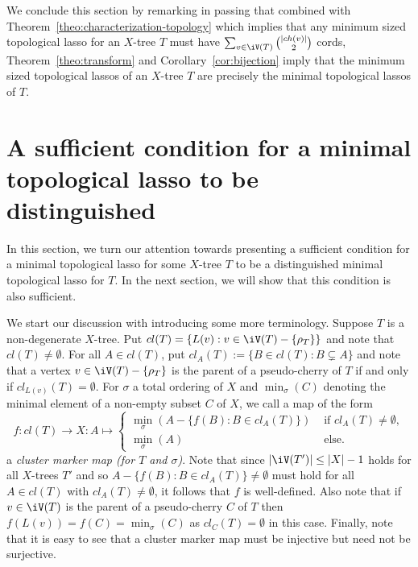 We conclude this section by remarking in passing that combined with
Theorem~\ref{theo:characterization-topology} which implies that any minimum
sized topological lasso for an $X$-tree $T$ must have $\sum_{v\in
  \iV(T)}{|ch(v)|\choose 2}$ cords, Theorem~\ref{theo:transform} and
Corollary~\ref{cor:bijection} imply that the minimum sized topological lassos
of an $X$-tree $T$ are precisely the minimal topological lassos of $T$.
 
\section{A sufficient condition for a minimal topological lasso to be
  distinguished}
\label{sec:sufficient}
In this section, we turn our attention towards presenting a sufficient
condition for a minimal topological lasso for some $X$-tree $T$ to be a
distinguished minimal topological lasso for $T$.  In the next section, we will
show that this condition is also sufficient.

We start our discussion with introducing some more terminology.  Suppose $T$
is a non-degenerate $X$-tree. Put $cl(T)=\{L(v): v\in \iV(T)-\{\rho_T\}\}$ and
note that $cl(T)\not=\emptyset$. For all $A\in cl(T)$, put $cl_A(T):=\{B\in
cl(T): B\subsetneq A\}$ and note that a vertex $v\in \iV(T)-\{\rho_T\}$ is the
parent of a pseudo-cherry of $T$ if and only if $cl_{L(v)}(T)=\emptyset$.  For
$\sigma$ a total ordering of $X$ and $\min_{\sigma}(C)$ denoting the minimal
element of a non-empty subset $C$ of $X$, we call a map of the form
$$
f:cl(T)\to X:
A\mapsto \left\{\begin{array}{cc}
\min_{\sigma}(A-\{f(B): B\in cl_A(T)\})
 & \mbox{ if }cl_A(T)\not=\emptyset,\\
\min_{\sigma}(A)  & \mbox{ else. }
\end{array}
\right.
$$ 
a {\em cluster marker map (for $T$ and $\sigma$)}.  Note that since
$|\iV(T')|\leq |X|-1$ holds for all $X$-trees $T'$ and so $A-\{f(B): B\in
cl_A(T)\}\not=\emptyset$ must hold for all $A\in cl(T)$ with
$cl_A(T)\not=\emptyset $, it follows that $f$ is well-defined.
Also note that if $v\in \iV(T)$ is the parent of a pseudo-cherry $C$ of $T$
then $f(L(v))=f(C)= \min_{\sigma}(C)$ as $cl_C(T)=\emptyset$ in this
case. Finally, note that it is easy to see that a cluster marker map must be
injective but need not be surjective.


